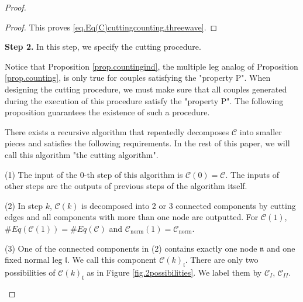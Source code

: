 \begin{proof}
\begin{proof}
This proves \eqref{eq.Eq(C)cuttingcounting.threewave}.
\end{proof}









\textbf{Step 2.} In this step, we specify the cutting procedure. 

Notice that Proposition \ref{prop.countingind}, the multiple leg analog of Proposition \ref{prop.counting}, is only true for couples satisfying the "property P". When designing the cutting procedure, we must make sure that all couples generated during the execution of this procedure satisfy the "property P". The following proposition guarantees the existence of such a procedure.

\begin{prop}\label{prop.cuttingalgorithm}
There exists a recursive algorithm that repeatedly decomposes $\mathcal{C}$ into smaller pieces and satisfies the following requirements. In the rest of this paper, we will call this algorithm "the cutting algorithm".

(1) The input of the $0$-th step of this algorithm is $\mathcal{C}(0)=\mathcal{C}$. The inputs of other steps are the outputs of previous steps of the algorithm itself.

(2) In step $k$, $\mathcal{C}(k)$ is decomposed into 2 or 3 connected components by cutting edges and all components with more than one node are outputted. For $\mathcal{C}(1)$, $\# Eq(\mathcal{C}(1))=\# Eq(\mathcal{C})$ and $\mathcal{C}_{\text{norm}}(1)=\mathcal{C}_{\text{norm}}$.

(3) One of the connected components in (2) contains exactly one node $\mathfrak{n}$ and one fixed normal leg $\mathfrak{l}$. We call this component $\mathcal{C}(k)_{
\mathfrak{l}}$. There are only two possibilities of $\mathcal{C}(k)_{\mathfrak{l}}$ as in Figure \ref{fig.2possibilities}. We label them by $\mathcal{C}_{I}$, $\mathcal{C}_{II}$.

\begin{figure}[H]
    \centering
\end{figure}
\end{prop}
\end{proof}
